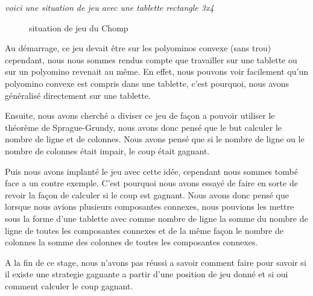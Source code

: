 \textit{
  voici une situation de jeu avec une tablette rectangle 3x4
}

\begin{figure}[h]
  \centering
  \caption{situation de jeu du Chomp}
 
\end{figure}
Au démarrage, ce jeu devait être sur les polyominos convexe (sans trou) cependant, nous nous sommes rendus compte que travailler sur une tablette ou sur un polyomino revenait au même. En effet, nous pouvons voir facilement qu'un polyomino convexe est compris dans une tablette, c'est pourquoi, nous avons généralisé directement sur une tablette.

Ensuite, nous avons cherché a diviser ce jeu de façon a pouvoir utiliser le théorème de Sprague-Grundy, nous avons donc pensé que le but calculer le nombre de ligne et de colonnes. Nous avons pensé que si le nombre de ligne ou le nombre de colonnes était impair, le coup était gagnant.

Puis nous avons implanté le jeu avec cette idée, cependant nous sommes tombé face a un contre exemple. C'est pourquoi nous avons essayé de faire en sorte de revoir la façon de calculer si le coup est gagnant. Nous avons donc pensé que lorsque nous avions plusieurs composantes connexes, nous pouvions les mettre sous la forme d'une tablette avec comme nombre de ligne la somme du nombre de ligne de toutes les composantes connexes et de la même façon le nombre de colonnes la somme des colonnes de toutes les composantes connexes.

A la fin de ce stage, nous n'avons pas réussi a savoir comment faire pour savoir si il existe une strategie gagnante a partir d'une position de jeu donné et si oui comment calculer le coup gagnant.